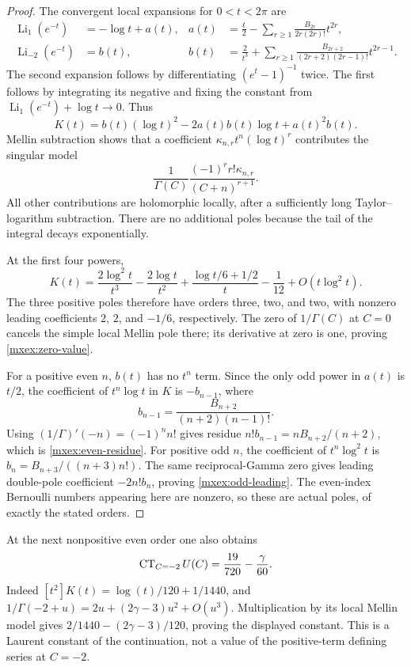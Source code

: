 \begin{proof}
The convergent local expansions for $0<t<2\pi$ are
\begin{align*}
 \operatorname{Li}_1(e^{-t})&=-\log t+a(t),&
 a(t)&=\frac t2-\sum_{r\geq1}
             \frac{B_{2r}}{2r(2r)!}t^{2r},\\
 \operatorname{Li}_{-2}(e^{-t})&=b(t),&
 b(t)&=\frac2{t^3}+\sum_{r\geq1}
             \frac{B_{2r+2}}{(2r+2)(2r-1)!}t^{2r-1}.
\end{align*}
The second expansion follows by differentiating
$(e^t-1)^{-1}$ twice.  The first follows by integrating its negative
and fixing the constant from
$\operatorname{Li}_1(e^{-t})+\log t\to0$.
Thus
\[
 K(t)=b(t)(\log t)^2-2a(t)b(t)\log t+a(t)^2b(t).
\]
Mellin subtraction shows that a coefficient
$\kappa_{n,r}t^n(\log t)^r$ contributes the singular model
\[
 \frac1{\Gamma(C)}
 \frac{(-1)^r r!\kappa_{n,r}}{(C+n)^{r+1}}.
\]
All other contributions are holomorphic locally, after a sufficiently
long Taylor--logarithm subtraction.  There are no additional poles
because the tail of the integral decays exponentially.

At the first four powers,
\begin{equation}\label{mxex:local-first}
 K(t)=\frac{2\log^2t}{t^3}
       -\frac{2\log t}{t^2}
       +\frac{\log t/6+1/2}{t}
       -\frac1{12}+O(t\log^2t).
\end{equation}
The three positive poles therefore have orders three, two, and two,
with nonzero leading coefficients $2$, $2$, and $-1/6$, respectively.
The zero of $1/\Gamma(C)$ at $C=0$ cancels the simple local Mellin
pole there; its derivative at zero is one, proving
\eqref{mxex:zero-value}.

For a positive even $n$, $b(t)$ has no $t^n$ term.  Since the only
odd power in $a(t)$ is $t/2$, the coefficient of $t^n\log t$ in
$K$ is $-b_{n-1}$, where
\[
 b_{n-1}=\frac{B_{n+2}}{(n+2)(n-1)!}.
\]
Using $(1/\Gamma)'(-n)=(-1)^n n!$ gives residue
$n!b_{n-1}=nB_{n+2}/(n+2)$, which is
\eqref{mxex:even-residue}.  For positive odd $n$, the coefficient
of $t^n\log^2t$ is
$b_n=B_{n+3}/((n+3)n!)$.  The same reciprocal-Gamma zero gives
leading double-pole coefficient $-2n!b_n$, proving
\eqref{mxex:odd-leading}.  The even-index Bernoulli numbers appearing
here are nonzero, so these are actual poles, of exactly the stated
orders.
\end{proof}


At the next nonpositive even order one also obtains
\begin{equation}\label{mixed:Uminus2}
 \operatorname{CT}_{C=-2}U(C)=\frac{19}{720}-\frac{\gamma}{60}.
\end{equation}
Indeed $[t^2]K(t)=\log(t)/120+1/1440$, and
$1/\Gamma(-2+u)=2u+(2\gamma-3)u^2+O(u^3)$.
Multiplication by its local Mellin model gives
$2/1440-(2\gamma-3)/120$, proving the displayed constant.
This is a Laurent constant of the continuation, not a value of the
positive-term defining series at $C=-2$.

